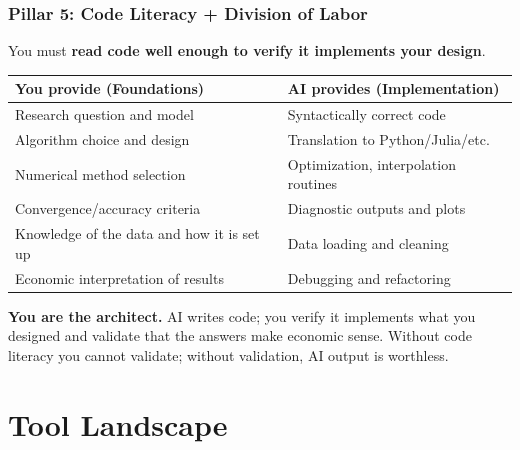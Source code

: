 \documentclass[10pt,english,aspectratio=169]{beamer}
\begin{document}
\begin{frame}
\frametitle{Pillar 5: Code Literacy + Division of Labor}

You must \textbf{read code well enough to verify it implements your design}.

\vspace{0.2cm}

\begin{center}
\small
\begin{tabular}{|p{5.4cm}|p{6.0cm}|}
\hline
\textbf{You provide (Foundations)} & \textbf{AI provides (Implementation)} \\ \hline
Research question and model & Syntactically correct code \\ \hline
Algorithm choice and design & Translation to Python/Julia/etc.\ \\ \hline
Numerical method selection & Optimization, interpolation routines \\ \hline
Convergence/accuracy criteria & Diagnostic outputs and plots \\ \hline
Knowledge of the data and how it is set up & Data loading and cleaning \\ \hline
Economic interpretation of results & Debugging and refactoring \\ \hline
\end{tabular}
\end{center}

\vspace{0.2cm}

\textbf{You are the architect.} AI writes code; you verify it implements what you designed and validate that the answers make economic sense. Without code literacy you cannot validate; without validation, AI output is worthless.
\end{frame}

\section{Tool Landscape}
\end{document}
